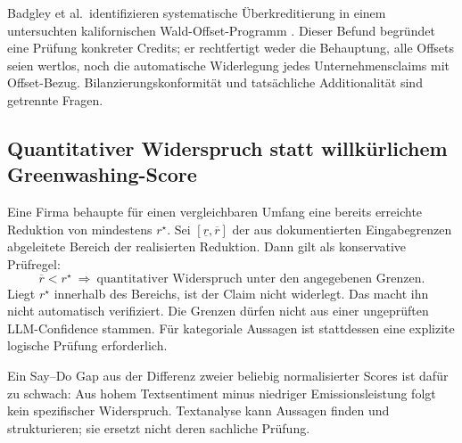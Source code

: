 \documentclass[11pt,a4paper]{article}
\begin{document}
Badgley et al.\ identifizieren systematische Überkreditierung in einem untersuchten kalifornischen Wald-Offset-Programm \cite{badgley2022}. Dieser Befund begründet eine Prüfung konkreter Credits; er rechtfertigt weder die Behauptung, alle Offsets seien wertlos, noch die automatische Widerlegung jedes Unternehmensclaims mit Offset-Bezug. Bilanzierungskonformität und tatsächliche Additionalität sind getrennte Fragen.

\subsection{Quantitativer Widerspruch statt willkürlichem Greenwashing-Score}
Eine Firma behaupte für einen vergleichbaren Umfang eine bereits erreichte Reduktion von mindestens $r^\star$. Sei $[\underline r,\overline r]$ der aus dokumentierten Eingabegrenzen abgeleitete Bereich der realisierten Reduktion. Dann gilt als konservative Prüfregel:
\begin{equation}
\overline r<r^\star\ \Longrightarrow\ \text{quantitativer Widerspruch unter den angegebenen Grenzen}.
\end{equation}
Liegt $r^\star$ innerhalb des Bereichs, ist der Claim nicht widerlegt. Das macht ihn nicht automatisch verifiziert. Die Grenzen dürfen nicht aus einer ungeprüften LLM-\glqq Confidence\grqq{} stammen. Für kategoriale Aussagen ist stattdessen eine explizite logische Prüfung erforderlich.

Ein \glqq Say--Do Gap\grqq{} aus der Differenz zweier beliebig normalisierter Scores ist dafür zu schwach: Aus hohem Textsentiment minus niedriger Emissionsleistung folgt kein spezifischer Widerspruch. Textanalyse kann Aussagen finden und strukturieren; sie ersetzt nicht deren sachliche Prüfung.
\end{document}
